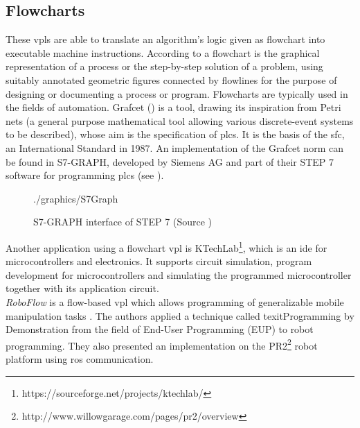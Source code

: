 \subsection{Flowcharts}
These \glspl{vpl} are able to translate an algorithm's logic given as flowchart into executable machine instructions. According to \cite{ISO2382} a flowchart is the graphical representation of a process or the step-by-step solution of a problem, using suitably annotated geometric figures connected by flowlines for the purpose of designing or documenting a process or program. Flowcharts are typically used in the fields of automation. Grafcet (\cite{Grafcet}) is a tool, drawing its inspiration from Petri nets (a general purpose mathematical tool allowing various discrete-event systems to be described), whose aim is the specification of \glspl{plc}. It is the basis of the \gls{sfc}, an International Standard in 1987. An implementation of the Grafcet norm can be found in S7-GRAPH, developed by Siemens AG and part of their STEP 7 software for programming \glspl{plc} (see ). \\

\begin{figure}[!htpb]
	\centering
	\begin{overpic}[width=0.65\linewidth]{./graphics/S7Graph}
	\end{overpic}
    \caption[S7-GRAPH interface of  STEP 7]%
        {S7-GRAPH interface of  STEP 7 (Source \footnotemark)}
	\label{fig:S7Graph}%
\end{figure}

Another application using a flowchart \gls{vpl} is KTechLab\footnote{https://sourceforge.net/projects/ktechlab/}, which is an \gls{ide} for microcontrollers and electronics. It supports circuit simulation, program development for microcontrollers and simulating the programmed microcontroller together with its application circuit. \\

\textit{RoboFlow} is a flow-based \gls{vpl} which allows programming of generalizable mobile manipulation tasks \cite{RoboFlow7139973}. The authors applied a technique called texit{Programming by Demonstration} from the field of End-User Programming (EUP) to robot programming. They also presented an implementation on the PR2\footnote{http://www.willowgarage.com/pages/pr2/overview} robot platform using \gls{ros} communication. \\

